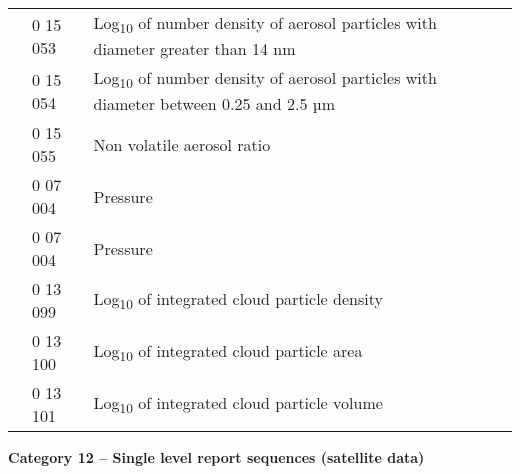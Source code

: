 \begin{longtable}[]{@{}llll@{}}
& 0 15 053 & Log\textsubscript{10} of number density of aerosol particles with diameter greater than 14 nm &\tabularnewline
& 0 15 054 & Log\textsubscript{10} of number density of aerosol particles with diameter between 0.25 and 2.5 µm &\tabularnewline
& 0 15 055 & Non volatile aerosol ratio &\tabularnewline
& 0 07 004 & Pressure &\tabularnewline
& 0 07 004 & Pressure &\tabularnewline
& 0 13 099 & Log\textsubscript{10} of integrated cloud particle density &\tabularnewline
& 0 13 100 & Log\textsubscript{10} of integrated cloud particle area &\tabularnewline
& 0 13 101 & Log\textsubscript{10} of integrated cloud particle volume &\tabularnewline
\bottomrule
\end{longtable}

\textbf{Category 12 -- Single level report sequences (satellite data)}


